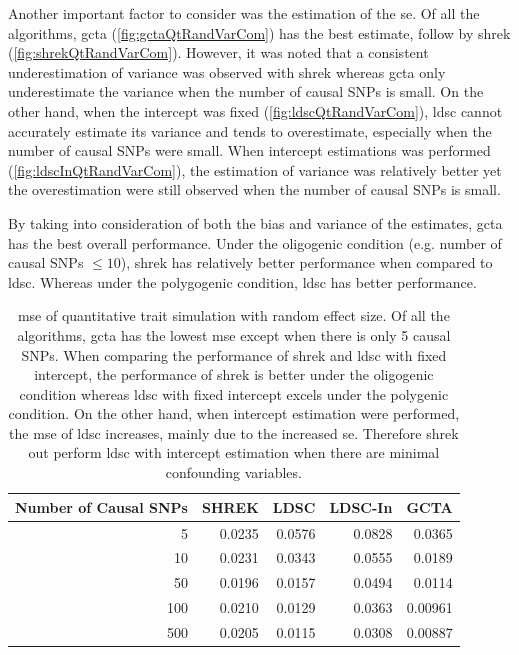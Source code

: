 		Another important factor to consider was the estimation of the \gls{se}. 
		Of all the algorithms, \gls{gcta} (\cref{fig:gctaQtRandVarCom}) has the best estimate, follow by \gls{shrek} (\cref{fig:shrekQtRandVarCom}).
		However, it was noted that a consistent underestimation of variance was observed with \gls{shrek} whereas \gls{gcta} only underestimate the variance when the number of causal \glspl{SNP} is small.
		On the other hand, when the intercept was fixed (\cref{fig:ldscQtRandVarCom}), \gls{ldsc} cannot accurately estimate its variance and tends to overestimate, especially when the number of causal \glspl{SNP} were small. 
		When intercept estimations was performed (\cref{fig:ldscInQtRandVarCom}), the estimation of variance was relatively better yet the overestimation were still observed when the number of causal \glspl{SNP} is small. 
		
		By taking into consideration of both the bias and variance of the estimates, \gls{gcta} has the best overall performance. 
		Under the oligogenic condition (e.g. number of causal \glspl{SNP} $\le10$), \gls{shrek} has relatively better performance when compared to \gls{ldsc}.
		Whereas under the polygogenic condition, \gls{ldsc} has better performance. 
		
		\begin{table}
			\centering
			\begin{tabular}{rrrrr}
				\toprule
				Number of Causal SNPs&	SHREK&	LDSC&	LDSC-In&	GCTA \\
				\midrule
				5	&	0.0235	&	0.0576	&	0.0828	&	0.0365\\
				10	&	0.0231	&	0.0343	&	0.0555	&	0.0189\\
				50	&	0.0196	&	0.0157	&	0.0494	&	0.0114\\
				100	&	0.0210	&	0.0129	&	0.0363	&	0.00961\\
				500	&	0.0205	&	0.0115	&	0.0308	&	0.00887\\
				\bottomrule
			\end{tabular}
			\caption[MSE of Quantitative Trait Simulation with Random Effect Size]{
				\Gls{mse} of quantitative trait simulation with random effect size.
				Of all the algorithms, \gls{gcta} has the lowest \gls{mse} except when there is only 5 causal \glspl{SNP}.
				When comparing the performance of \gls{shrek} and \gls{ldsc} with fixed intercept, the performance of \gls{shrek} is better under the oligogenic condition whereas \gls{ldsc} with fixed intercept excels under the polygenic condition. 
				On the other hand, when intercept estimation were performed, the \gls{mse} of \gls{ldsc} increases, mainly due to the increased \gls{se}. 
				Therefore \gls{shrek} out perform \gls{ldsc} with intercept estimation when there are minimal confounding variables.
				}
			\label{tab:mseQtRandom}
		\end{table}
		

